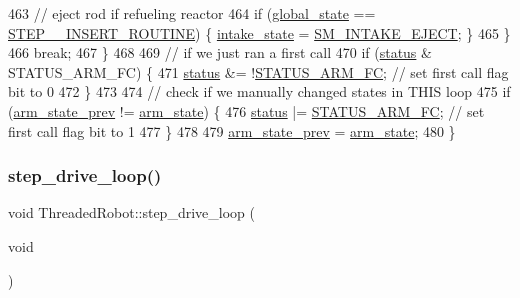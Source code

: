 \begin{DoxyCode}
463                 \textcolor{comment}{// eject rod if refueling reactor}
464                 \textcolor{keywordflow}{if} (\hyperlink{class_threaded_robot_a92782be4dc437d7e84b04d20a39a5de3}{global\_state} == \hyperlink{_threaded_robot_8hpp_aa746f89a7ab4e61cfe763ca6ad8a2e22}{STEP\_\_INSERT\_ROUTINE}) \{ 
      \hyperlink{class_threaded_robot_a832f25be64f45ff3297d3da9609a9391}{intake\_state} = \hyperlink{_threaded_robot_8hpp_aee99598bb6301112885aebf03222896f}{SM\_INTAKE\_EJECT}; \}
465             \}
466             \textcolor{keywordflow}{break};
467     \}
468 
469     \textcolor{comment}{// if we just ran a first call}
470     \textcolor{keywordflow}{if} (\hyperlink{class_threaded_robot_a10f3a9d1b27ca8e7a1ada75323c75879}{status} & STATUS\_ARM\_FC) \{
471         \hyperlink{class_threaded_robot_a10f3a9d1b27ca8e7a1ada75323c75879}{status} &= !\hyperlink{_threaded_robot_8hpp_af64a9cac77953e37e9facd5f39a41ea6}{STATUS\_ARM\_FC}; \textcolor{comment}{// set first call flag bit to 0}
472     \}
473 
474     \textcolor{comment}{// check if we manually changed states in THIS loop}
475     \textcolor{keywordflow}{if} (\hyperlink{class_threaded_robot_a77a621d5f607ff296ceac51c831a3258}{arm\_state\_prev} != \hyperlink{class_threaded_robot_a19026abe96d44213f7e8b3983be2d968}{arm\_state}) \{
476         \hyperlink{class_threaded_robot_a10f3a9d1b27ca8e7a1ada75323c75879}{status} |= \hyperlink{_threaded_robot_8hpp_af64a9cac77953e37e9facd5f39a41ea6}{STATUS\_ARM\_FC}; \textcolor{comment}{// set first call flag bit to 1}
477     \}
478 
479     \hyperlink{class_threaded_robot_a77a621d5f607ff296ceac51c831a3258}{arm\_state\_prev} = \hyperlink{class_threaded_robot_a19026abe96d44213f7e8b3983be2d968}{arm\_state};
480 \}
\end{DoxyCode}
\mbox{\label{class_threaded_robot_ac4f1dd23e0b7ec167c9b80875d06d4c6}} 
\subsubsection{\texorpdfstring{step\+\_\+drive\+\_\+loop()}{step\_drive\_loop()}}
{\footnotesize\ttfamily void Threaded\+Robot\+::step\+\_\+drive\+\_\+loop (\begin{DoxyParamCaption}\item[{void}]{ }\end{DoxyParamCaption})\hspace{0.3cm}{\ttfamily [private]}}



